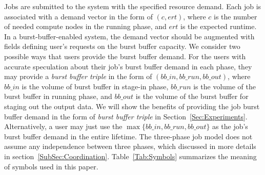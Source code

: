 Jobs are submitted to the system with the specified resource demand.
Each job is associated with a demand vector in the form of $(c, ert)$,
where $c$ is the number of needed compute nodes in the running phase, and
$ert$ is the expected runtime.
In a burst-buffer-enabled system, the demand vector should be augmented
with fields defining user's requests on the burst buffer capacity.
We consider two possible ways that users provide the burst buffer demand.
For the users with accurate speculation about their job's burst buffer demand in each phase,
they may provide a \textit{burst buffer triple} in the form of $(bb\_in, bb\_run, bb\_out)$,
where $bb\_in$ is the volume of burst buffer in stage-in phase,
$bb\_run$ is the volume of the burst buffer in running phase, and
$bb\_out$ is the volume of the burst buffer for staging out the output data.
We will show the benefits of providing the job burst buffer demand in the form of \textit{burst buffer triple} in Section~\ref{Sec:Experiments}.
Alternatively, a user may just use the $\max\{bb\_in, bb\_run, bb\_out\}$
as the job's burst buffer demand in the entire lifetime.
The three-phase job model does not assume any independence between three phases, which
discussed in more details in section~\ref{SubSec:Coordination}.
Table~\ref{Tab:Symbols} summarizes the meaning of symbols used in this paper.




